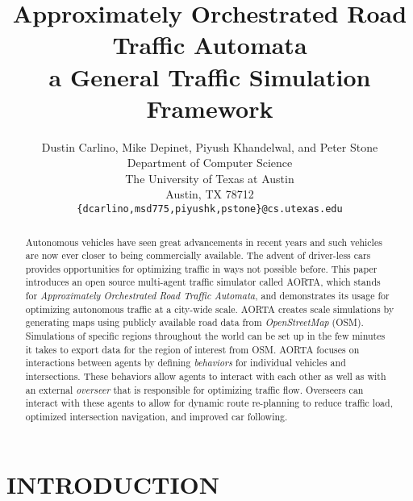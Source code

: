 \documentclass[letterpaper, 10 pt, conference]{ieeeconf}  %
\title{\LARGE \bf
Approximately Orchestrated Road Traffic Automata\\
a General Traffic Simulation Framework
}
\author{Dustin Carlino, Mike Depinet, Piyush Khandelwal, and Peter Stone\\
        Department of Computer Science\\
        The University of Texas at Austin\\
        Austin, TX 78712\\
        {\tt \small\{dcarlino,msd775,piyushk,pstone\}@cs.utexas.edu}}
\begin{document}
\maketitle
\thispagestyle{empty}
\pagestyle{empty}



\begin{abstract} 
Autonomous vehicles have seen great advancements in recent years and
such vehicles are now ever closer to being commercially available.
The advent of driver-less cars provides opportunities for optimizing
traffic in ways not possible before. This paper introduces an open
source multi-agent traffic simulator called AORTA, which stands for
\textit{Approximately Orchestrated Road Traffic Automata}, and
demonstrates its usage for optimizing autonomous traffic at a
city-wide scale. AORTA creates scale simulations by generating maps
using publicly available road data from \textit{OpenStreetMap}
(OSM). Simulations of specific regions throughout the world can be set
up in the few minutes it takes to export data for the region of
interest from OSM. AORTA focuses on interactions between agents by
defining \textit{behaviors} for individual vehicles and
intersections. These behaviors allow agents to interact with each
other as well as with an external \textit{overseer} that is
responsible for optimizing traffic flow. Overseers can interact with
these agents to allow for dynamic route re-planning to reduce traffic
load, optimized intersection navigation, and improved car following.
\end{abstract}


\section{INTRODUCTION}
\label{sec:introduction}

\end{document}

